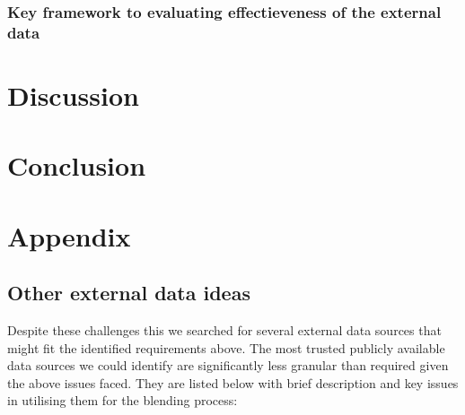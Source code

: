 \documentclass{article}
\begin{document}
\subsubsection{Key framework to evaluating effectieveness of the external data}

\noindent


\section{Discussion}

\section{Conclusion}



\section{Appendix}

\subsection{Other external data ideas}



Despite these challenges this we searched for several external data sources that might fit the identified requirements above. The most trusted publicly available data sources we could identify are 
significantly less granular than required given the above issues faced. They are 
listed below with brief description and key issues in utilising them 
for the blending process:
\end{document}

